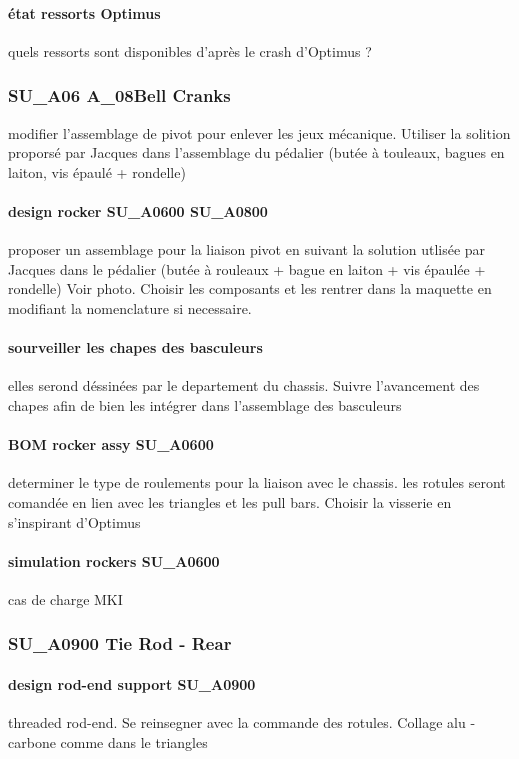 			\paragraph{état ressorts Optimus} quels ressorts sont disponibles d'après le crash d'Optimus ?
		\subsubsection*{SU\_A06 A\_08Bell Cranks} 
 \par modifier l'assemblage de pivot pour enlever les jeux mécanique. Utiliser la solition proporsé par Jacques dans l'assemblage du pédalier (butée à touleaux, bagues en laiton, vis épaulé + rondelle)
			\paragraph{design rocker SU\_A0600 SU\_A0800} proposer un assemblage pour la liaison pivot en suivant la solution utlisée par Jacques dans le pédalier (butée à rouleaux + bague en laiton + vis épaulée + rondelle) Voir photo. Choisir les composants et les rentrer dans la maquette en modifiant la nomenclature si necessaire.
			\paragraph{sourveiller les chapes des basculeurs} elles serond déssinées par le departement du chassis. Suivre l'avancement des chapes afin de bien les intégrer dans l'assemblage des basculeurs
			\paragraph{BOM rocker assy SU\_A0600} determiner le type de roulements pour la liaison avec le chassis. les rotules seront comandée en lien avec les triangles et les pull bars. Choisir la visserie en s'inspirant d'Optimus
			\paragraph{simulation rockers SU\_A0600} cas de charge MKI
		\subsubsection*{SU\_A0900 Tie Rod - Rear} 
 \par 
			\paragraph{design rod-end support SU\_A0900} threaded rod-end. Se reinsegner avec la commande des rotules. Collage alu - carbone comme dans le triangles

